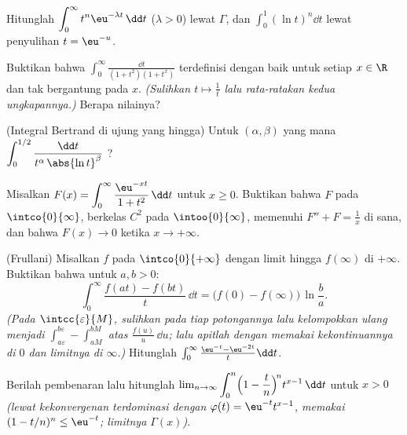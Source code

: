 \begin{exercise}[$\star$]\label{exo:b2:integration:2}
Hitunglah $\displaystyle\int_0^\infty t^n \eu^{-\lambda t}\,\dd t$
($\lambda > 0$) lewat $\Gamma$, dan
$\displaystyle\int_0^1 (\ln t)^n \dd t$ lewat penyulihan $t =
\eu^{-u}$.
\end{exercise}

\begin{exercise}[$\star$]\label{exo:b2:integration:3}
Buktikan bahwa $\displaystyle\int_0^{\infty} \frac{\dd t}{(1 +
t^2)(1 + t^x)}$ terdefinisi dengan baik untuk setiap $x \in \R$ dan
tak bergantung pada $x$. \emph{(Sulihkan $t \mapsto \frac1t$ lalu
rata-ratakan kedua ungkapannya.)} Berapa nilainya?
\end{exercise}

\begin{exercise}[$\star\star$]\label{exo:b2:integration:4}
(Integral Bertrand di ujung yang hingga) Untuk $(\alpha,
\beta)$ yang mana $\displaystyle\int_0^{1/2}
\frac{\dd t}{t^\alpha\,\abs{\ln t}^\beta}$ ?
\end{exercise}

\begin{exercise}[$\star\star$]\label{exo:b2:integration:5}
Misalkan $F(x) = \displaystyle\int_0^{\infty} \frac{\eu^{-xt}}{1 +
t^2}\,\dd t$ untuk $x \geq 0$. Buktikan bahwa $F$  pada
$\intco{0}{\infty}$, berkelas $C^2$ pada $\intoo{0}{\infty}$, memenuhi
$F'' + F = \frac1x$ di sana, dan bahwa $F(x) \to 0$ ketika $x \to +\infty$.
\end{exercise}

\begin{exercise}[$\star\star$]\label{exo:b2:integration:6}
(Frullani) Misalkan $f$  pada $\intco{0}{+\infty}$ dengan
limit hingga $f(\infty)$ di $+\infty$. Buktikan bahwa untuk $a, b > 0$:
\[
\int_0^{\infty} \frac{f(at) - f(bt)}{t}\,\dd t
= \bigl(f(0) - f(\infty)\bigr)\,\ln\frac ba .
\]
\emph{(Pada $\intcc{\varepsilon}{M}$, sulihkan pada tiap potongannya lalu
kelompokkan ulang menjadi $\int_{a\varepsilon}^{b\varepsilon} -
\int_{aM}^{bM}$ atas $\frac{f(u)}u\,\dd u$; lalu apitlah dengan memakai
kekontinuannya di $0$ dan limitnya di $\infty$.)} Hitunglah
$\int_0^\infty \frac{\eu^{-t} - \eu^{-2t}}{t}\dd t$.
\end{exercise}

\begin{exercise}[$\star\star$]\label{exo:b2:integration:7}
Berilah pembenaran lalu hitunglah $\lim_{n\to\infty}
\displaystyle\int_0^n \Bigl(1 - \frac tn\Bigr)^{\!n} t^{x-1}\,\dd t$
untuk $x > 0$ \emph{(lewat kekonvergenan terdominasi dengan $\varphi(t)
= \eu^{-t}t^{x-1}$, memakai $(1 - t/n)^n \leq \eu^{-t}$; limitnya
$\Gamma(x)$)}.
\end{exercise}

